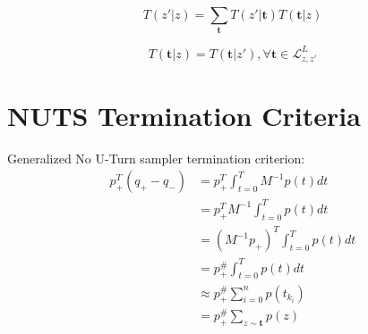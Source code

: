 \documentclass[]{report}
\begin{document}
\[T(z'|z) = \sum_{\mathbf{t}} T(z'|\mathbf{t}) T(\mathbf{t}|z) \]

\[T(\mathbf{t}|z) = T(\mathbf{t}|z') , \forall \mathbf{t} \in \mathcal{L}^L_{z,z'} \]

\section{NUTS Termination Criteria}

Generalized No U-Turn sampler termination criterion:
\begin{align*}
 p_{+}^T (q_{+} -q_{-})  
 &=p_{+}^T \int_{t=0}^{T} M^{-1}p(t) dt   \\
 &=p_{+}^T M^{-1} \int_{t=0}^{T} p(t)dt \\
 &=(M^{-1} p_{+})^T  \int_{t=0}^{T} p(t)dt \\
 &= p^{\#}_{+}  \int_{t=0}^{T} p(t)dt \\
 &\approx p^{\#}_{+} \sum_{i=0}^n p(t_{k_i}) \\
 &=  p^{\#}_{+} \sum_{z \sim \mathbf{t}} p(z) \\
\end{align*}
 
\end{document}
